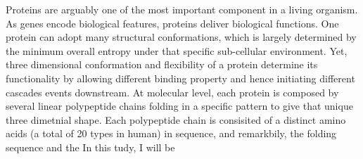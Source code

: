 Proteins are arguably one of the most important component in a living organism. As genes encode biological features, proteins deliver biological functions. One protein can adopt many structural conformations, which is largely determined by the minimum overall entropy under that specific sub-cellular environment. Yet, three dimensional conformation and flexibility of a protein determine its functionality by allowing different binding property and hence initiating different cascades events downstream. At molecular level, each protein is composed by several linear polypeptide chains folding in a specific pattern to give that unique three dimetnial shape. Each polypeptide chain is consisited of a distinct amino acids (a total of 20 types in human) in sequence, and remarkbily, the folding sequence and  the  In this tudy, I will be 